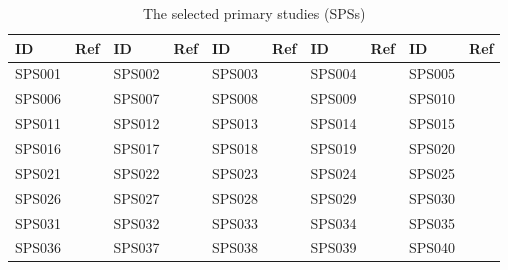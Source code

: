 \begin{table*}[ht]
    \renewcommand{\arraystretch}{1.3}
    \centering
	\caption{The \totalStudies{} selected primary studies (SPSs)}
	\begin{tabular}{p{1.3cm}p{1.0cm}p{1.3cm}p{1.0cm}p{1.3cm}p{1.0cm}p{1.3cm}p{1.0cm}p{1.3cm}p{1.0cm}}
        \hline
		\textbf{ID} & \textbf{Ref} & \textbf{ID} & \textbf{Ref} & \textbf{ID} & \textbf{Ref} & \textbf{ID} & \textbf{Ref} & \textbf{ID} & \textbf{Ref} \\
		\hline
		SPS001      & \cite{Selikhov2005}          & SPS002      & \cite{Venkataraman2015}          & SPS003      & \cite{Padmanabhan2011}          & SPS004      & \cite{10.1145/3594539}          & SPS005      & \cite{Wu2012}          \\
		SPS006      & \cite{Korkhov2008}          & SPS007      & \cite{Anand2011}          & SPS008      & \cite{Altunay2011}          & SPS009      & \cite{Liu2015}          & SPS010      & \cite{Wang2020}         \\
		SPS011      & \cite{10.1016/j.future.2019.05.062}         & SPS012      & \cite{10.1109/GCE.2014.8}         & SPS013      & \cite{Quang2015}         & SPS014      & \cite{Abramson2002}         & SPS015      & \cite{Saad2016}         \\
		SPS016      & \cite{Butt2006}         & SPS017      & \cite{10.1145/1566445.1566492}         & SPS018      & \cite{Grehant2013}         & SPS019      & \cite{10.1016/j.future.2017.11.007}         & SPS020      & \cite{Curran2009}         \\
		SPS021      & \cite{Cai2023}         & SPS022      & \cite{Chard2016}         & SPS023      & \cite{Juve2012}         & SPS024      & \cite{Zarza2012}         & SPS025      & \cite{DomizziSanchez-Gallegos2021}         \\
		SPS026      & \cite{Filgueira2017}         & SPS027      & \cite{Sfiligoi2022}         & SPS028      & \cite{Lenards2011}         & SPS029      & \cite{Belgin2022}         & SPS030      & \cite{10.1016/j.jbi.2014.01.005}         \\
		SPS031      & \cite{10.14778/1453856.1453865}         & SPS032      & \cite{10.5555/3018088.3018092}         & SPS033      & \cite{Frey2001}         & SPS034      & \cite{Zhou2021}         & SPS035      & \cite{Belkin2018}         \\
		SPS036      & \cite{10.1016/j.jss.2017.01.007}         & SPS037      & \cite{Zhou2023a}         & SPS038      & \cite{10.1007/s11227-022-04848-y}         & SPS039      & \cite{10.1145/3311790.3396625}         & SPS040      & \cite{Urbah2009}         \\

\end{tabular}
\end{table*}
